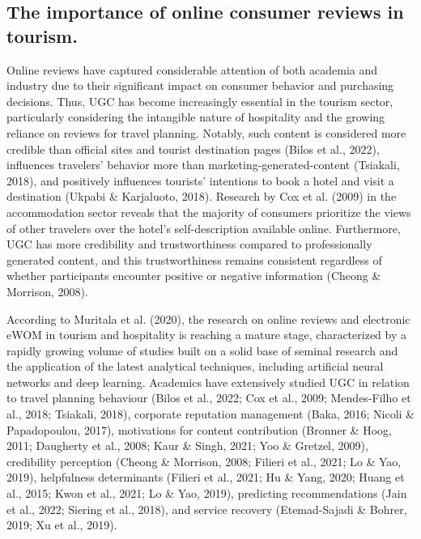 \documentclass[
]{agujournal2019}
\begin{document}
\subsection{The importance of online consumer reviews in
tourism.}\label{the-importance-of-online-consumer-reviews-in-tourism.}

Online reviews have captured considerable attention of both academia and
industry due to their significant impact on consumer behavior and
purchasing decisions. Thus, UGC has become increasingly essential in the
tourism sector, particularly considering the intangible nature of
hospitality and the growing reliance on reviews for travel planning.
Notably, such content is considered more credible than official sites
and tourist destination pages (Bilos et al., 2022), influences
travelers' behavior more than marketing-generated-content (Tsiakali,
2018), and positively influences tourists' intentions to book a hotel
and visit a destination (Ukpabi \& Karjaluoto, 2018). Research by Cox et
al. (2009) in the accommodation sector reveals that the majority of
consumers prioritize the views of other travelers over the hotel's
self-description available online. Furthermore, UGC has more credibility
and trustworthiness compared to professionally generated content, and
this trustworthiness remains consistent regardless of whether
participants encounter positive or negative information (Cheong \&
Morrison, 2008).

According to Muritala et al. (2020), the research on online reviews and
electronic eWOM in tourism and hospitality is reaching a mature stage,
characterized by a rapidly growing volume of studies built on a solid
base of seminal research and the application of the latest analytical
techniques, including artificial neural networks and deep learning.
Academics have extensively studied UGC in relation to travel planning
behaviour (Bilos et al., 2022; Cox et al., 2009; Mendes-Filho et al.,
2018; Tsiakali, 2018), corporate reputation management (Baka, 2016;
Nicoli \& Papadopoulou, 2017), motivations for content contribution
(Bronner \& Hoog, 2011; Daugherty et al., 2008; Kaur \& Singh, 2021; Yoo
\& Gretzel, 2009), credibility perception (Cheong \& Morrison, 2008;
Filieri et al., 2021; Lo \& Yao, 2019), helpfulness determinants
(Filieri et al., 2021; Hu \& Yang, 2020; Huang et al., 2015; Kwon et
al., 2021; Lo \& Yao, 2019), predicting recommendations (Jain et al.,
2022; Siering et al., 2018), and service recovery (Etemad-Sajadi \&
Bohrer, 2019; Xu et al., 2019).
\end{document}
